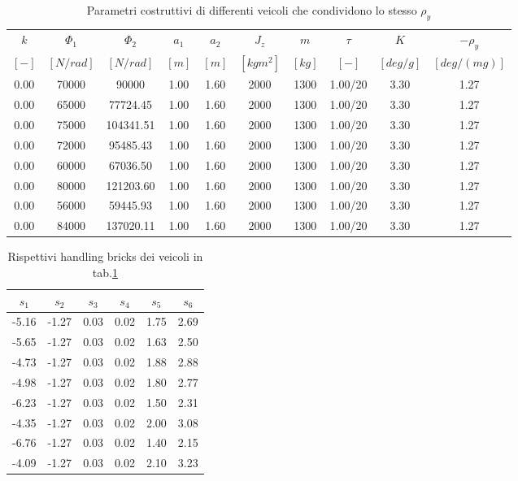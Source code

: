 \begin{table}[htbp]
  \centering
  \footnotesize
  \begin{tabular}{@{}|c|c|c|c|c|c|c|c|c|c|@{}}
    \hline
    $k$   & $\Phi_1$    & $\Phi_2$    & $a_1$   & $a_2$   & $J_z$   & $m$    & $\tau$    & $K$    & $-\rho_y$ \\
    $[-]$ & $[N/rad]$ & $[N/rad]$ & $[m]$ & $[m]$ & $[kg m^2]$ & $[kg]$ & $[-]$ & $[deg/g]$ & $[deg/(mg)]$ \\
    \hline
    0.00  & 70000 & 90000 & 1.00 & 1.60 & 2000 & 1300 & 1.00/20 & 3.30 & 1.27 \\
    \hline
    0.00  & 65000 & 77724.45 & 1.00 & 1.60 & 2000 & 1300 & 1.00/20 & 3.30 & 1.27 \\
    \hline
    0.00  & 75000 & 104341.51 & 1.00 & 1.60 & 2000 & 1300 & 1.00/20 & 3.30 & 1.27 \\
    \hline
    0.00  & 72000 & 95485.43 & 1.00 & 1.60 & 2000 & 1300 & 1.00/20 & 3.30 & 1.27 \\
    \hline
    0.00  & 60000 & 67036.50 & 1.00 & 1.60 & 2000 & 1300 & 1.00/20 & 3.30 & 1.27 \\
    \hline
    0.00  & 80000 & 121203.60 & 1.00 & 1.60 & 2000 & 1300 & 1.00/20 & 3.30 & 1.27 \\
    \hline
    0.00  & 56000 & 59445.93 & 1.00 & 1.60 & 2000 & 1300 & 1.00/20 & 3.30 & 1.27 \\
    \hline
    0.00  & 84000 & 137020.11 & 1.00 & 1.60 & 2000 & 1300 & 1.00/20 & 3.30 & 1.27 \\
    \hline
  \end{tabular}
  \caption{Parametri costruttivi di differenti veicoli che condividono lo stesso $\rho_y$}
  \label{tab:table 7.3}
\end{table}
\begin{table}[htbp]
  \centering
  \begin{tabular}{@{}|c|c|c|c|c|c|@{}}
    \hline
     $s_1$   & $s_2$   & $s_3$   & $s_4$   & $s_5$   & $s_6$\\
     \hline
    -5.16 & -1.27 & 0.03 & 0.02 & 1.75 & 2.69 \\
    \hline
    -5.65 & -1.27 & 0.03 & 0.02 & 1.63 & 2.50 \\
    \hline
    -4.73 & -1.27 & 0.03 & 0.02 & 1.88 & 2.88 \\
    \hline
    -4.98 & -1.27 & 0.03 & 0.02 & 1.80 & 2.77 \\
    \hline
    -6.23 & -1.27 & 0.03 & 0.02 & 1.50 & 2.31 \\
    \hline
    -4.35 & -1.27 & 0.03 & 0.02 & 2.00 & 3.08 \\
    \hline
    -6.76 & -1.27 & 0.03 & 0.02 & 1.40 & 2.15 \\
    \hline
    -4.09 & -1.27 & 0.03 & 0.02 & 2.10 & 3.23 \\ 
    \hline
  \end{tabular}
  \caption{Rispettivi handling bricks dei veicoli in tab.\ref{tab:table 7.3}}
  \label{tab:table 7.3 s}
\end{table}

